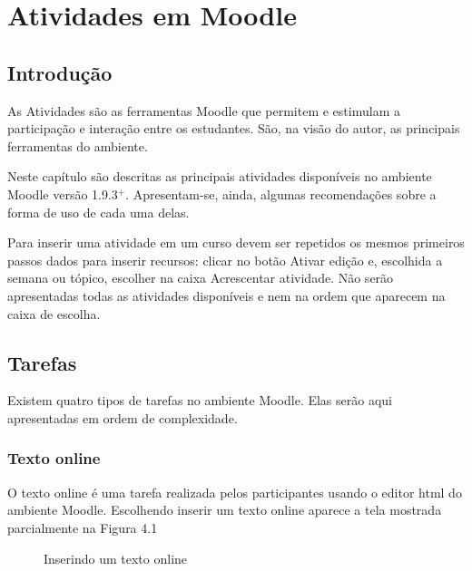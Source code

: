 \chapter{Atividades em Moodle}


\section{Introdução}

As Atividades são as ferramentas Moodle que permitem e estimulam a participação e interação entre os estudantes. São, na visão do autor, as principais ferramentas do ambiente.

Neste capítulo são descritas as principais atividades disponíveis no ambiente Moodle versão 1.9.3$^+$. Apresentam-se, ainda, algumas recomendações sobre a forma de uso de cada uma delas.

Para inserir uma atividade em um curso devem ser repetidos os mesmos primeiros passos dados para inserir recursos: clicar no botão Ativar edição e, escolhida a semana ou tópico, escolher na caixa Acrescentar atividade. Não serão apresentadas todas as atividades disponíveis e nem na ordem que aparecem na caixa de escolha.

\section{Tarefas}


Existem quatro tipos de tarefas no ambiente Moodle. Elas serão aqui apresentadas em ordem de complexidade.

\subsection{Texto online}


O texto online é uma tarefa realizada pelos participantes usando o editor html do ambiente Moodle. Escolhendo inserir um texto online aparece a tela mostrada parcialmente na Figura 4.1

\begin{figure}
 \begin{center}
  \caption{Inserindo um texto online}
 \end{center}
\end{figure}

